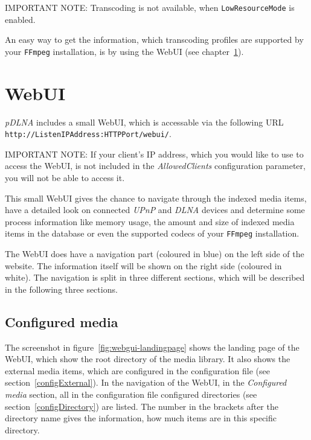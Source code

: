 \documentclass[a4paper,oneside,10pt]{report}
\newenvironment{colframeimportantnote}{%
  \begin{Sbox}
    \begin{minipage}{.99\columnwidth}
}{%
  \end{minipage}
  \end{Sbox}
  \begin{center}
    \fcolorbox{black}{Orange}{\TheSbox}
  \end{center}
}
\begin{document}
\begin{colframeimportantnote}
\textsc{IMPORTANT NOTE:} Transcoding is not available, when \verb|LowResourceMode| is enabled.
\end{colframeimportantnote}

An easy way to get the information, which transcoding profiles are supported by your \verb|FFmpeg| installation, is by using the WebUI (see chapter~\ref{webui}).

%
%

\chapter{WebUI}
\label{webui}

{\em pDLNA} includes a small WebUI, which is accessable via the following URL \verb|http://ListenIPAddress:HTTPPort/webui/|.

\begin{colframeimportantnote}
\textsc{IMPORTANT NOTE:} If your client's IP address, which you would like to use to access the WebUI, is not included in the {\em AllowedClients} configuration parameter, you will not be able to access it.
\end{colframeimportantnote}

This small WebUI gives the chance to navigate through the indexed media items, have a detailed look on connected {\em UPnP} and {\em DLNA} devices and determine some process information like memory usage, the amount and size of indexed media items in the database or even the supported codecs of your \verb|FFmpeg| installation.

The WebUI does have a navigation part (coloured in blue) on the left side of the website. The information itself will be shown on the right side (coloured in white). The navigation is split in three different sections, which will be described in the following three sections.

\section{Configured media}

The screenshot in figure~\ref{fig:webgui-landingpage} shows the landing page of the WebUI, which show the root directory of the media library. It also shows the external media items, which are configured in the configuration file (see section~\ref{configExternal}). In the navigation of the WebUI, in the {\em Configured media} section, all in the configuration file configured directories (see section~\ref{configDirectory}) are listed. The number in the brackets after the directory name gives the information, how much items are in this specific directory.
\end{document}
